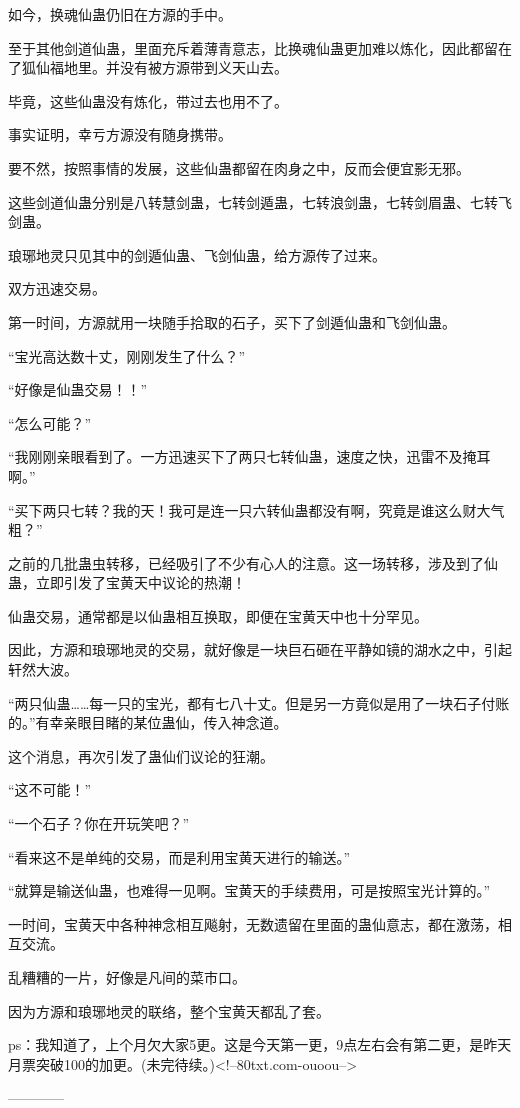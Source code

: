 \begin{this_body}
如今，换魂仙蛊仍旧在方源的手中。

至于其他剑道仙蛊，里面充斥着薄青意志，比换魂仙蛊更加难以炼化，因此都留在了狐仙福地里。并没有被方源带到义天山去。

毕竟，这些仙蛊没有炼化，带过去也用不了。

事实证明，幸亏方源没有随身携带。

要不然，按照事情的发展，这些仙蛊都留在肉身之中，反而会便宜影无邪。

这些剑道仙蛊分别是八转慧剑蛊，七转剑遁蛊，七转浪剑蛊，七转剑眉蛊、七转飞剑蛊。

琅琊地灵只见其中的剑遁仙蛊、飞剑仙蛊，给方源传了过来。

双方迅速交易。

第一时间，方源就用一块随手拾取的石子，买下了剑遁仙蛊和飞剑仙蛊。

“宝光高达数十丈，刚刚发生了什么？”

“好像是仙蛊交易！！”

“怎么可能？”

“我刚刚亲眼看到了。一方迅速买下了两只七转仙蛊，速度之快，迅雷不及掩耳啊。”

“买下两只七转？我的天！我可是连一只六转仙蛊都没有啊，究竟是谁这么财大气粗？”

之前的几批蛊虫转移，已经吸引了不少有心人的注意。这一场转移，涉及到了仙蛊，立即引发了宝黄天中议论的热潮！

仙蛊交易，通常都是以仙蛊相互换取，即便在宝黄天中也十分罕见。

因此，方源和琅琊地灵的交易，就好像是一块巨石砸在平静如镜的湖水之中，引起轩然大波。

“两只仙蛊……每一只的宝光，都有七八十丈。但是另一方竟似是用了一块石子付账的。”有幸亲眼目睹的某位蛊仙，传入神念道。

这个消息，再次引发了蛊仙们议论的狂潮。

“这不可能！”

“一个石子？你在开玩笑吧？”

“看来这不是单纯的交易，而是利用宝黄天进行的输送。”

“就算是输送仙蛊，也难得一见啊。宝黄天的手续费用，可是按照宝光计算的。”

一时间，宝黄天中各种神念相互飚射，无数遗留在里面的蛊仙意志，都在激荡，相互交流。

乱糟糟的一片，好像是凡间的菜市口。

因为方源和琅琊地灵的联络，整个宝黄天都乱了套。

ps：我知道了，上个月欠大家5更。这是今天第一更，9点左右会有第二更，是昨天月票突破100的加更。(未完待续。)<!--80txt.com-ouoou-->

------------

\end{this_body}

